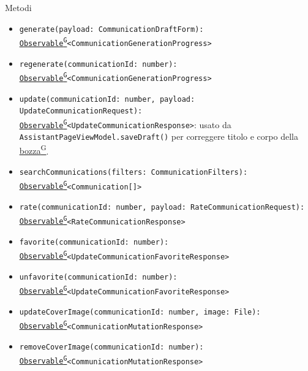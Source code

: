 \documentclass[a4paper,12pt]{article}
\providecommand{\glslink}[2]{\href{https://alittlebyte-19.github.io/Documentazione/glossario.html\#gls-#1}{\underline{#2}\textsuperscript{\scriptsize G}}}
\begin{document}
\begin{sloppypar}
Metodi
\begin{itemize}\raggedright\small
    \item \texttt{generate(payload: CommunicationDraftForm):}\\ \hspace*{1.5em}\texttt{\glslink{observable}{Observable}<CommunicationGenerationProgress>}
    \item \texttt{regenerate(communicationId: number):}\\ \hspace*{1.5em}\texttt{\glslink{observable}{Observable}<CommunicationGenerationProgress>}
    \item \texttt{update(communicationId: number, payload: UpdateCommunicationRequest):}\\ \hspace*{1.5em}\texttt{\glslink{observable}{Observable}<UpdateCommunicationResponse>}: usato da \texttt{AssistantPageViewModel.saveDraft()} per correggere titolo e corpo della \glslink{bozza-draft}{bozza}.
    \item \texttt{searchCommunications(filters: CommunicationFilters):}\\ \hspace*{1.5em}\texttt{\glslink{observable}{Observable}<Communication[]>}
    \item \texttt{rate(communicationId: number, payload: RateCommunicationRequest):}\\ \hspace*{1.5em}\texttt{\glslink{observable}{Observable}<RateCommunicationResponse>}
    \item \texttt{favorite(communicationId: number):}\\ \hspace*{1.5em}\texttt{\glslink{observable}{Observable}<UpdateCommunicationFavoriteResponse>}
    \item \texttt{unfavorite(communicationId: number):}\\ \hspace*{1.5em}\texttt{\glslink{observable}{Observable}<UpdateCommunicationFavoriteResponse>}
    \item \texttt{updateCoverImage(communicationId: number, image: File):}\\ \hspace*{1.5em}\texttt{\glslink{observable}{Observable}<CommunicationMutationResponse>}
    \item \texttt{removeCoverImage(communicationId: number):}\\ \hspace*{1.5em}\texttt{\glslink{observable}{Observable}<CommunicationMutationResponse>}

\end{itemize}
\end{sloppypar}
\end{document}
